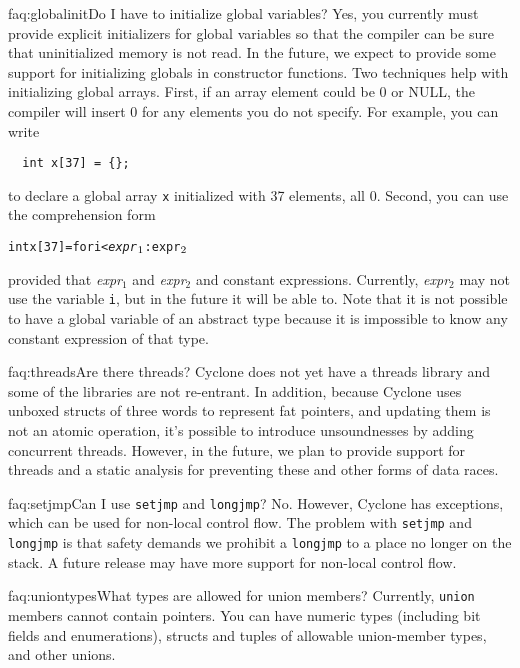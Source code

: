 \begin{faqa}{faq:globalinit}{Do I have to initialize global variables?}
Yes, you currently must provide explicit initializers for global
variables so that the compiler can be sure that uninitialized
memory is not read.  In the future, we expect to provide some support
for initializing globals in constructor functions.  Two techniques
help with initializing global arrays.  First, if an array element
could be 0 or NULL, the compiler will insert 0 for any elements you do
not specify.  For example, you can write
\begin{verbatim}
  int x[37] = {};
\end{verbatim}
to declare a global array \texttt{x} initialized with 37 elements, all 0.
Second, you can use
the comprehension form
\begin{alltt}
  int x[37] = \lb for i < \textit{expr}\(\sb{1}\) : \texttt{expr}\(\sb{2}\) \rb
\end{alltt}
provided that 
\textit{expr}$_1$ and
\textit{expr}$_2$ and
constant expressions.
Currently, \textit{expr}$_2$ may not use the variable \texttt{i}, but
in the future it will be able to.  Note that it is not possible to
have a global variable of an abstract type because it is impossible to
know any constant expression of that type.
\end{faqa}

\begin{faqa}{faq:threads}{Are there threads?}
Cyclone does not yet have a threads library and some of the libraries
are not re-entrant.  In addition, because Cyclone uses unboxed structs
of three words
to represent fat pointers, and updating them is not an atomic operation,
it's possible to introduce unsoundnesses by adding concurrent threads.
However, in the future, we plan to provide support for threads and
a static analysis for preventing these and other forms of data races.
\end{faqa}

\begin{faqa}{faq:setjmp}{Can I use \texttt{setjmp} and \texttt{longjmp}?}
No.  However, Cyclone has exceptions, which can be used for non-local
control flow.  The problem with \texttt{setjmp} and \texttt{longjmp}
is that safety demands we prohibit a \texttt{longjmp} to a place no
longer on the stack.  A future release may have more support for
non-local control flow.
\end{faqa}

\begin{faqa}{faq:uniontypes}{What types are allowed for union members?}
Currently, \texttt{union} members cannot contain pointers.  You can
have numeric types (including bit fields and enumerations), structs
and tuples of allowable union-member types, and other unions.
\end{faqa}

